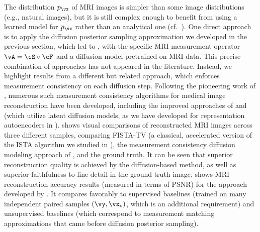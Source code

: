 \documentclass[../../book-main.tex]{subfiles}
\begin{document}
The distribution
$p_{\vx}$ of MRI images is simpler than some image distributions (e.g., natural
images), but it is still complex enough to benefit from using a learned model
for $p_{\vx}$ rather than an analytical one (cf.\ \cite{Wright-Ma-2022}).
One direct approach is to apply the diffusion posterior sampling approximation
we developed in the previous section, which led to
, with the specific MRI
measurement operator $\vA = \cS \circ \cF$ and a diffusion model pretrained on
MRI data.
This precise combination of approaches has not appeared in the literature.
Instead, we highlight results from a different but related approach, which
enforces measurement consistency on each diffusion step.
Following the pioneering work of \textcite{song2022solving}, numerous
such measurement consistency algorithms for medical image
reconstruction have been
developed, including the improved approaches of \textcite{song2024solving} and
\textcite{rout2023solving} (which utilize latent diffusion models, as we have
    developed for representation autoencoders in
).
 shows visual comparisons of reconstructed
MRI images across three different samples, comparing FISTA-TV (a classical,
    accelerated version of the ISTA algorithm we studied in
),
the measurement consistency diffusion modeling approach of
\textcite{song2022solving}, and the ground truth. It can be seen that superior
reconstruction quality is achieved by the diffusion-based method, as well as
superior faithfulness to fine detail in the ground truth image.
 shows MRI reconstruction accuracy results
(measured in terms of PSNR)
for the approach developed by \textcite{song2022solving}. It compares favorably
to supervised baselines (trained on many independent paired samples $(\vy,
\vx_o)$, which is an additional requirement) and unsupervised baselines (which
    correspond to measurement matching approximations that came before diffusion
posterior sampling).
\end{document}
